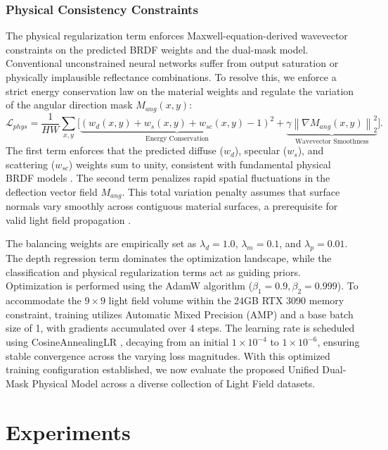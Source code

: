 \documentclass[lettersize,journal]{IEEEtran}
\begin{document}
\subsubsection{Physical Consistency Constraints}
The physical regularization term enforces Maxwell-equation-derived wavevector constraints on the predicted BRDF weights and the dual-mask model. Conventional unconstrained neural networks suffer from output saturation or physically implausible reflectance combinations. To resolve this, we enforce a strict energy conservation law on the material weights and regulate the variation of the angular direction mask $M_{ang}(x,y)$:
\begin{equation}
\label{eq:phys_loss}
\mathcal{L}_{phys} = \frac{1}{HW} \sum_{x,y} \Bigg[ \underbrace{\left( w_d(x,y) + w_s(x,y) + w_{sc}(x,y) - 1 \right)^2}_{\text{Energy Conservation}} + \underbrace{\gamma \left\| \nabla M_{ang}(x,y) \right\|_2^2}_{\text{Wavevector Smoothness}} \Bigg].
\end{equation}
The first term enforces that the predicted diffuse ($w_d$), specular ($w_s$), and scattering ($w_{sc}$) weights sum to unity, consistent with fundamental physical BRDF models \cite{blinn1977}. The second term penalizes rapid spatial fluctuations in the deflection vector field $M_{ang}$. This total variation penalty assumes that surface normals vary smoothly across contiguous material surfaces, a prerequisite for valid light field propagation \cite{zhang2023}. 

The balancing weights are empirically set as $\lambda_{d} = 1.0$, $\lambda_{m} = 0.1$, and $\lambda_{p} = 0.01$. The depth regression term dominates the optimization landscape, while the classification and physical regularization terms act as guiding priors. Optimization is performed using the AdamW algorithm ($\beta_1=0.9, \beta_2=0.999$). To accommodate the $9 \times 9$ light field volume within the 24GB RTX 3090 memory constraint, training utilizes Automatic Mixed Precision (AMP) and a base batch size of 1, with gradients accumulated over 4 steps. The learning rate is scheduled using CosineAnnealingLR \cite{heber2018}, decaying from an initial $1 \times 10^{-4}$ to $1 \times 10^{-6}$, ensuring stable convergence across the varying loss magnitudes. With this optimized training configuration established, we now evaluate the proposed Unified Dual-Mask Physical Model across a diverse collection of Light Field datasets.

\section{Experiments}
\end{document}
